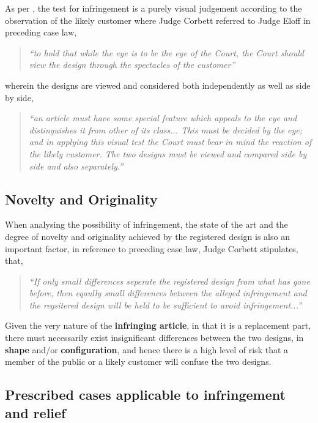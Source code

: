 \documentclass[11pt]{article}
\begin{document}
As per 
\cite{corbett84_homecraft_steel_v_sm_hare}, the test for infringement is a purely
visual judgement according to the observation of the likely customer where Judge
Corbett referred to Judge Eloff in preceding case law,
\begin{quote}
\textit{``to hold that while the eye is to be the eye of the Court, the
Court should view the design through the spectacles of the customer''}
\end{quote}
wherein the designs are viewed and considered both independently as well as
side by side,
\begin{quote}
\textit{``an article must have some special feature which appeals to the
eye and distinguishes it from other of its class... This must be decided by the
eye; and in applying this visual test the Court must bear in mind the reaction
of the likely customer. The two designs must be viewed and compared side by side
and also separately.''}
\end{quote}

\subsection{Novelty and Originality}
\label{sec:orgaeda47e}

When analysing the possibility of infringement, the state of the art and the
degree of novelty and originality achieved by the registered design is also an
important factor, in reference to preceding case law, Judge Corbett stipulates,
\cite{corbett84_homecraft_steel_v_sm_hare} that,
\begin{quote}
\textit{``If only small differences seperate the registered design from
what has gone before, then eqaully small differences between the alleged
infringement and the regsitered design will be held to be sufficient to avoid
infringement...''}
\end{quote}
Given the very nature of the \textbf{infringing article}, in that it is a replacement
part, there must necessarily exist insignificant differences between the two
designs, in \textbf{shape} and/or \textbf{configuration}, and hence there is a high level of
risk that a member of the public or a likely customer will confuse the two
designs.

\subsection{Prescribed cases applicable to infringement and relief}
\label{sec:orgf4e9080}
\end{document}

